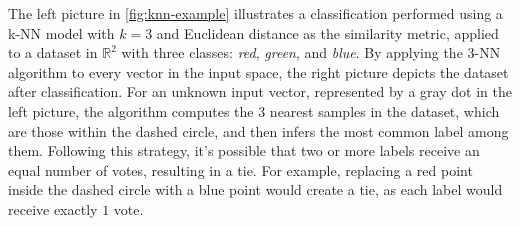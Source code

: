The left picture in \autoref{fig:knn-example} illustrates a classification performed using a k-NN model with $k=3$ and Euclidean distance as the similarity metric, applied to a dataset in $\mathbb{R}^2$ with three classes: \emph{red}, \emph{green}, and \emph{blue}. By applying the $3$-NN algorithm to every vector in the input space, the right picture depicts the dataset after classification. For an unknown input vector, represented by a gray dot in the left picture, the algorithm computes the 3 nearest samples in the dataset, which are those within the dashed circle, and then infers the most common label among them. Following this strategy, it's possible that two or more labels receive an equal number of votes, resulting in a tie. For example, replacing a red point inside the dashed circle with a blue point would create a tie, as each label would receive exactly $1$ vote.

